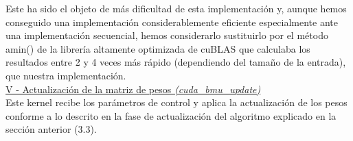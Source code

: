 Este ha sido el objeto de más dificultad de esta implementación y, aunque hemos conseguido una implementación considerablemente eficiente especialmente ante una implementación secuencial, hemos considerarlo sustituirlo por el método amin() de la librería altamente optimizada de cuBLAS que calculaba los resultados entre 2 y 4 veces más rápido (dependiendo del tamaño de la entrada), que nuestra implementación.\\

\underline{ V - Actualización de la matriz de pesos \textit{(cuda\_bmu\_update)}} \\
Este kernel recibe los parámetros de control y aplica la actualización de los pesos conforme a lo descrito en la fase de actualización del algoritmo explicado en la sección anterior (3.3).
